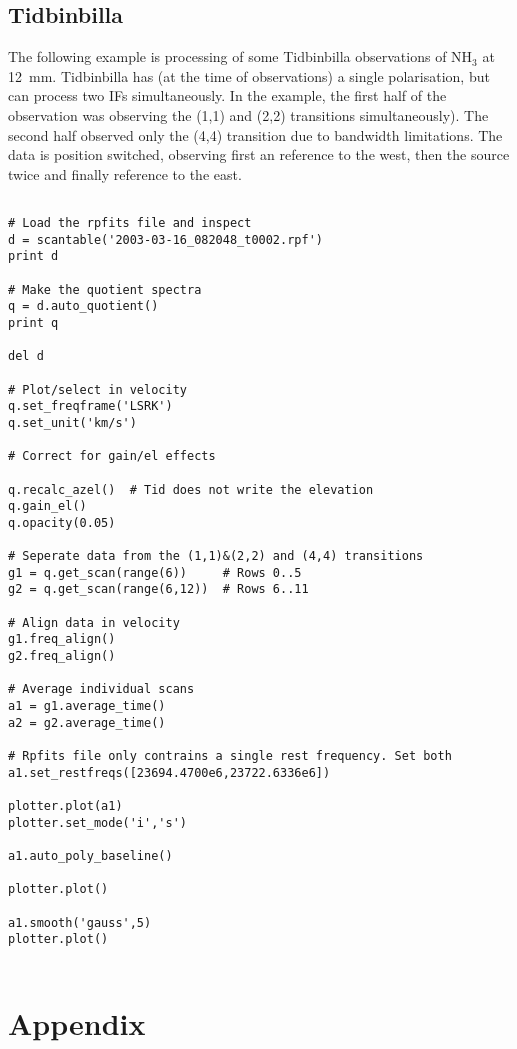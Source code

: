 \documentclass[11pt]{article}
\begin{document}
\subsection{Tidbinbilla}

The following example is processing of some
Tidbinbilla observations of NH$_3$ at 12~mm. Tidbinbilla has (at the
time of observations) a single polarisation, but can process two IFs
simultaneously. In the example, the first half of the observation was
observing the (1,1) and (2,2) transitions simultaneously). The second
half observed only the (4,4) transition due to bandwidth
limitations. The data is position switched, observing first an
reference to the west, then the source twice and finally reference to
the east.

\begin{verbatim}

# Load the rpfits file and inspect
d = scantable('2003-03-16_082048_t0002.rpf')
print d

# Make the quotient spectra
q = d.auto_quotient()
print q

del d

# Plot/select in velocity
q.set_freqframe('LSRK')
q.set_unit('km/s')

# Correct for gain/el effects

q.recalc_azel()  # Tid does not write the elevation
q.gain_el()
q.opacity(0.05)

# Seperate data from the (1,1)&(2,2) and (4,4) transitions
g1 = q.get_scan(range(6))     # Rows 0..5
g2 = q.get_scan(range(6,12))  # Rows 6..11

# Align data in velocity
g1.freq_align()
g2.freq_align()

# Average individual scans
a1 = g1.average_time()
a2 = g2.average_time()

# Rpfits file only contrains a single rest frequency. Set both
a1.set_restfreqs([23694.4700e6,23722.6336e6])

plotter.plot(a1)
plotter.set_mode('i','s')

a1.auto_poly_baseline()

plotter.plot()

a1.smooth('gauss',5)
plotter.plot()


\end{verbatim}

\newpage

\section{Appendix}
\end{document}
